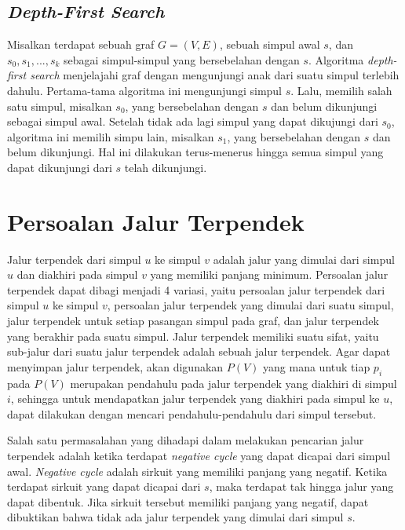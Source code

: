     \medskip
    

    \subsection{\textit{Depth-First Search}}
    Misalkan terdapat sebuah graf $G = (V, E)$, sebuah simpul awal $s$, dan $s_{0}, s_{1}, ..., s_{k}$ sebagai simpul-simpul 
    yang bersebelahan dengan $s$. Algoritma \textit{depth-first search} menjelajahi 
    graf dengan mengunjungi anak dari suatu simpul terlebih dahulu. Pertama-tama algoritma ini mengunjungi simpul $s$. Lalu, 
    memilih salah satu simpul, misalkan $s_{0}$, yang bersebelahan dengan $s$ dan belum dikunjungi sebagai simpul awal.
    Setelah tidak ada lagi simpul yang dapat dikujungi dari $s_{0}$, algoritma ini memilih simpu lain, misalkan $s_{1}$, yang bersebelahan dengan $s$ dan belum dikunjungi.
    Hal ini dilakukan terus-menerus hingga semua simpul yang dapat dikunjungi dari $s$ telah dikunjungi.

    \medskip
    

\section{Persoalan Jalur Terpendek}

Jalur terpendek dari simpul $u$ ke simpul $v$ adalah jalur yang dimulai dari simpul $u$ dan diakhiri pada simpul $v$ yang memiliki panjang minimum. 
Persoalan jalur terpendek dapat dibagi menjadi 4 variasi, yaitu persoalan jalur terpendek dari simpul $u$ ke simpul $v$, persoalan jalur terpendek yang 
dimulai dari suatu simpul, jalur terpendek untuk setiap pasangan simpul pada graf, dan jalur terpendek yang berakhir pada suatu simpul. Jalur 
terpendek memiliki suatu sifat, yaitu sub-jalur dari suatu jalur terpendek adalah sebuah jalur terpendek. Agar dapat menyimpan jalur terpendek, 
akan digunakan $P(V)$ yang mana untuk tiap $p_{i}$ pada $P(V)$ merupakan pendahulu pada jalur terpendek yang diakhiri di simpul $i$, sehingga untuk mendapatkan 
jalur terpendek yang diakhiri pada simpul ke $u$, dapat dilakukan dengan mencari pendahulu-pendahulu dari simpul tersebut.

\medskip


Salah satu permasalahan yang dihadapi dalam melakukan pencarian jalur terpendek adalah ketika terdapat \textit{negative cycle} yang dapat dicapai dari 
simpul awal. \textit{Negative cycle} adalah sirkuit yang memiliki panjang yang negatif. Ketika terdapat sirkuit yang dapat dicapai dari $s$, maka terdapat 
tak hingga jalur yang dapat dibentuk. Jika sirkuit tersebut memiliki panjang yang negatif, dapat dibuktikan bahwa tidak ada jalur terpendek 
yang dimulai dari simpul $s$.

